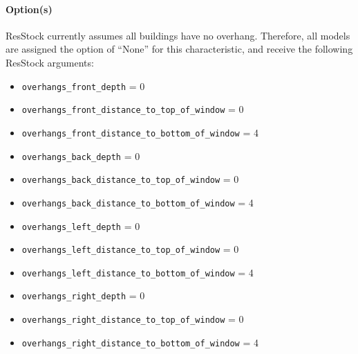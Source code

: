 \paragraph{Option(s)}
ResStock currently assumes all buildings have no overhang. Therefore, all models are assigned the option of ``None'' for this characteristic, and receive the following ResStock arguments: 
\begin{itemize}
    \item \texttt{overhangs\_front\_depth} = 0
\item \texttt{overhangs\_front\_distance\_to\_top\_of\_window} = 0 
\item \texttt{overhangs\_front\_distance\_to\_bottom\_of\_window} = 4 
\item \texttt{overhangs\_back\_depth} = 0
\item \texttt{overhangs\_back\_distance\_to\_top\_of\_window} = 0
\item \texttt{overhangs\_back\_distance\_to\_bottom\_of\_window} = 4
\item \texttt{overhangs\_left\_depth} = 0
\item \texttt{overhangs\_left\_distance\_to\_top\_of\_window} = 0 
\item \texttt{overhangs\_left\_distance\_to\_bottom\_of\_window} = 4
\item \texttt{overhangs\_right\_depth} = 0 
\item \texttt{overhangs\_right\_distance\_to\_top\_of\_window} = 0 
\item \texttt{overhangs\_right\_distance\_to\_bottom\_of\_window} = 4  
\end{itemize}

